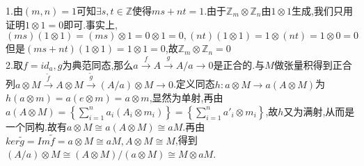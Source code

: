 \documentclass[b5paper]{ctexart}
\newcommand{\ts}[2]{#1\otimes #2}
\newcommand{\es}[5]{$#1\xrightarrow{#2}#3\xrightarrow{#4}#5\xrightarrow{}0$}
\begin{document}
\pagestyle{plain}
\noindent
1.由$(m,n)=1$可知$\exists s,t\in \mathbb{Z}$使得$ms+nt=1$.由于$\mathbb{Z}_m\otimes \mathbb{Z}_n$由$1\otimes 1$生成,我们只用证明$1\otimes 1=0$即可.事实上,$(ms)(1\otimes 1)=(ms)\otimes 1=0\otimes 1=0,(nt)(1\otimes 1)=1\otimes (nt)=1\otimes 0=0$但是$(ms+nt)(1\otimes 1)=1\otimes 1=0$,故$\mathbb{Z}_m\otimes \mathbb{Z}_n=0$\\
2.取$f=id_a,g$为典范同态,那么\es{a}{f}{A}{g}{A/a}是正合的.与$M$做张量积得到正合列\es{\ts{a}{M}}{\tilde{f}}{\ts{A}{M}}{\tilde{g}}{\ts{(A/a)}{M}}.定义同态$h:\ts{a}{M}\rightarrow a(\ts{A}{M})$为$h(\ts{a}{m})=a(\ts{e}{m})=\ts{a}{m}$,显然为单射,再由$a(\ts{A}{M})=\left\{\sum\limits_{i=1}^{n}a_i(\ts{A_i}{m_i})\right\}=\left\{\sum\limits_{i=1}^{n}\ts{a'_i}{m_i}\right\}$,故$h$又为满射,从而是一个同构.故有$\ts{a}{M}\cong a(\ts{A}{M})\cong aM$.再由$ker\tilde{g}=Im\tilde{f}=\ts{a}{M}\cong aM,\ts{A}{M}\cong M$,得到$\ts{(A/a)}{M}\cong (\ts{A}{M})/(\ts {a}{M})\cong \ts{M}{aM}$.\\
\end{document}
